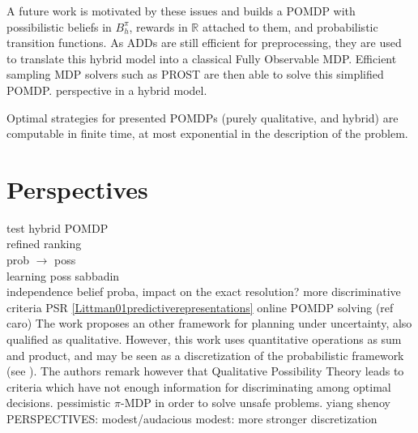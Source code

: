 A future work is motivated by these issues
and builds a POMDP with possibilistic beliefs in $B_h^{\pi}$,
rewards in $\mathbb{R}$ attached to them,
and probabilistic transition functions.
As ADDs are still efficient for preprocessing,
they are used to translate this hybrid
model into a classical Fully Observable MDP.
Efficient sampling MDP solvers such as PROST 
are then able to solve this simplified POMDP. 
perspective in a hybrid model.


Optimal strategies for presented POMDPs (purely qualitative, and hybrid)
are computable in finite time, at most exponential in the description of the problem.


\section*{Perspectives}
test hybrid POMDP\\
refined ranking\\
prob $\rightarrow$ poss\\
learning poss sabbadin\\

independence belief proba, impact on the exact resolution?
\cite{LIP61723} more discriminative criteria
PSR \ref{Littman01predictiverepresentations}
online POMDP solving (ref caro)
The work \cite{Bonet:2002:QMP:2073876.2073884} proposes an other framework
for planning under uncertainty, also qualified as qualitative. 
However, this work uses quantitative operations
as sum and product, and may be seen as a discretization of the probabilistic framework
(see \cite{Wilson:1995:OMC:2074158.2074221}).
The authors remark however that Qualitative Possibility Theory leads to 
criteria which have not enough information for discriminating
among optimal decisions.
pessimistic $\pi$-MDP in order to solve unsafe problems. yiang shenoy
PERSPECTIVES: modest/audacious
modest: more stronger discretization













